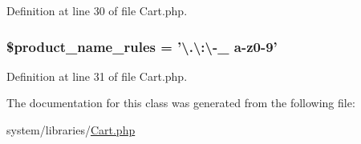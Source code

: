 Definition at line 30 of file Cart.\-php.

\hypertarget{class_c_i___cart_afdc2e791be5e676e94580a0d9ed63ebf}{
\subsubsection[{\$product\-\_\-name\-\_\-rules}]{\setlength{\rightskip}{0pt plus 5cm}\$product\-\_\-name\-\_\-rules = '\textbackslash{}.\textbackslash{}\-:\textbackslash{}-\/{\bf \-\_\-} {\bf a}-\/z0-\/9'}}\label{class_c_i___cart_afdc2e791be5e676e94580a0d9ed63ebf}


Definition at line 31 of file Cart.\-php.



The documentation for this class was generated from the following file\-:\begin{DoxyCompactItemize}
\item 
system/libraries/\hyperlink{_cart_8php}{Cart.\-php}\end{DoxyCompactItemize}
